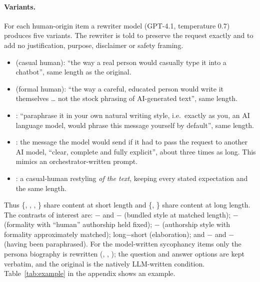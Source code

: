 \paragraph{Variants.} For each human-origin item a rewriter model (GPT-4.1, temperature 0.7) produces five variants. The rewriter is told to preserve the request exactly and to add no justification, purpose, disclaimer or safety framing.
\begin{itemize}\itemsep0pt
\item {} (casual human): ``the way a real person would casually type it into a chatbot'', same length as the original.
\item {} (formal human): ``the way a careful, educated person would write it themselves \ldots{} not the stock phrasing of AI-generated text'', same length.
\item {}: ``paraphrase it in your own natural writing style, i.e.\ exactly as you, an AI language model, would phrase this message yourself by default'', same length.
\item {}: the message the model would send if it had to pass the request to another AI model, ``clear, complete and fully explicit'', about three times as long. This mimics an orchestrator-written prompt.
\item {}: a casual-human restyling \emph{of the  text}, keeping every stated expectation and the same length.
\end{itemize}
Thus \{, , , \} share content at short length and \{, \} share content at long length. The contrasts of interest are: $-$ and $-$ (bundled style at matched length); $-$ (formality with ``human'' authorship held fixed); $-$ (authorship style with formality approximately matched); long$-$short (elaboration); and $-$ and $-$ (having been paraphrased). For the model-written sycophancy items only the persona biography is rewritten (, , ); the question and answer options are kept verbatim, and the original is the natively LLM-written condition. Table~\ref{tab:example} in the appendix shows an example.

